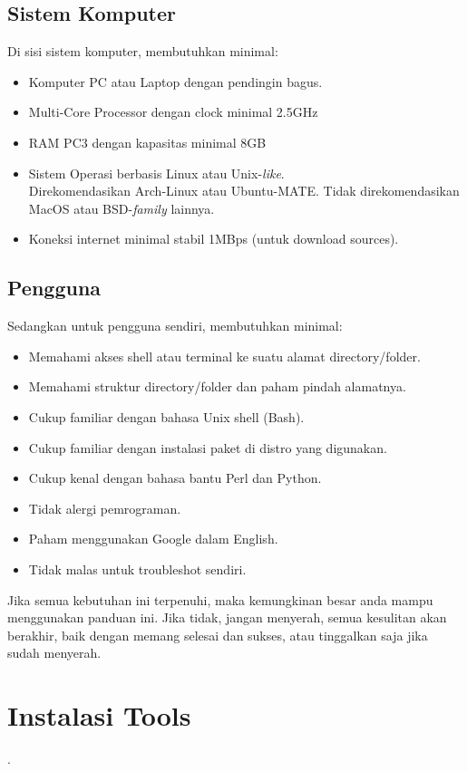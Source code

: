 \documentclass[12pt,]{article}
\begin{document}
	\subsection{Sistem Komputer}
	Di sisi sistem komputer, membutuhkan minimal:
	
	\begin{itemize}
		\item Komputer PC atau Laptop dengan pendingin bagus.
		\item Multi-Core Processor dengan clock minimal 2.5GHz
		\item RAM PC3 dengan kapasitas minimal 8GB
		\item Sistem Operasi berbasis Linux atau Unix-\textit{like}.\\
		Direkomendasikan Arch-Linux atau Ubuntu-MATE.
		Tidak direkomendasikan MacOS atau BSD-\textit{family} lainnya.
		\item Koneksi internet minimal stabil 1MBps (untuk download sources).
	\end{itemize}
	
	\subsection{Pengguna}
	Sedangkan untuk pengguna sendiri, membutuhkan minimal:
	
	\begin{itemize}
		\item Memahami akses shell atau terminal ke suatu alamat directory/folder.
		\item Memahami struktur directory/folder dan paham pindah alamatnya.
		\item Cukup familiar dengan bahasa Unix shell (Bash).
		\item Cukup familiar dengan instalasi paket di distro yang digunakan.
		\item Cukup kenal dengan bahasa bantu Perl dan Python.
		\item Tidak alergi pemrograman.
		\item Paham menggunakan Google dalam English.
		\item Tidak malas untuk troubleshot sendiri.
	\end{itemize}

	Jika semua kebutuhan ini terpenuhi, maka kemungkinan besar anda mampu menggunakan panduan ini.
	Jika tidak, jangan menyerah, semua kesulitan akan berakhir, baik dengan memang selesai dan sukses, atau tinggalkan saja jika sudah menyerah.
	
	\newpage
	\section{Instalasi Tools}.
	
\end{document}
